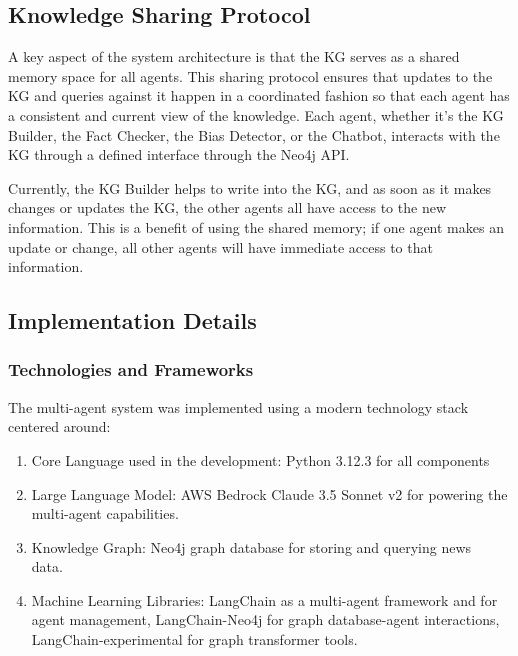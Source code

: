 \documentclass{scrartcl}
\begin{document}
\subsection{Knowledge Sharing Protocol}
A key aspect of the system architecture is that the KG serves as a shared memory space for all agents. This sharing protocol ensures that updates to the KG and queries against it happen in a coordinated fashion so that each agent has a consistent and current view of the knowledge. Each agent, whether it’s the KG Builder, the Fact Checker, the Bias Detector, or the Chatbot, interacts with the KG through a defined interface through the Neo4j API.

Currently, the KG Builder helps to write into the KG, and as soon as it makes changes or updates the KG, the other agents all have access to the new information. This is a benefit of using the shared memory; if one agent makes an update or change, all other agents will have immediate access to that information.

\subsection{Implementation Details}
\subsubsection{Technologies and Frameworks}
The multi-agent system was implemented using a modern technology stack centered around:
\begin{enumerate}
    \item Core Language used in the development: Python 3.12.3 for all components
    \item Large Language Model: AWS Bedrock Claude 3.5 Sonnet v2 for powering the multi-agent capabilities.
\item Knowledge Graph: Neo4j graph database for storing and querying news data.  
\item Machine Learning Libraries: LangChain as a multi-agent framework and for agent management, LangChain-Neo4j for graph database-agent interactions, LangChain-experimental for graph transformer tools.
\end{enumerate}
\end{document}
